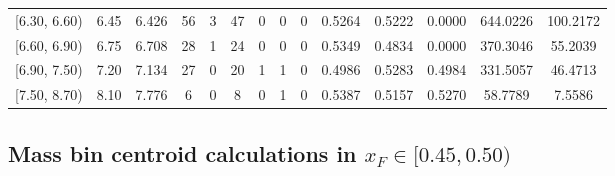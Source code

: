 \begin{table}[htbp]
{\begin{tabular}{cc|c|cccccc|ccc|cc}
        {[6.30, 6.60)} & 6.45 & 6.426 & 56 & 3 & 47 & 0 & 0 & 0 & 0.5264 & 0.5222 & 0.0000 & 644.0226 & 100.2172 \\
        {[6.60, 6.90)} & 6.75 & 6.708 & 28 & 1 & 24 & 0 & 0 & 0 & 0.5349 & 0.4834 & 0.0000 & 370.3046 & 55.2039 \\
        {[6.90, 7.50)} & 7.20 & 7.134 & 27 & 0 & 20 & 1 & 1 & 0 & 0.4986 & 0.5283 & 0.4984 & 331.5057 & 46.4713 \\
        {[7.50, 8.70)} & 8.10 & 7.776 & 6 & 0 & 8 & 0 & 1 & 0 & 0.5387 & 0.5157 & 0.5270 & 58.7789 & 7.5586 \\
        \hline\hline
    \end{tabular}
    }
\end{table}

\clearpage
\subsection{\texorpdfstring{Mass bin centroid calculations in $x_F \in [0.45, 0.50)$}{Mass bin centroid calculations in x\_F in [0.45, 0.50)]}}

